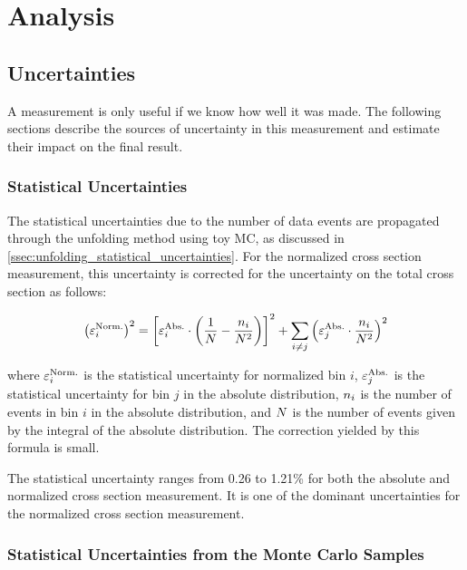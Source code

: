 \chapter{Analysis}
\label{chapter:analysis}

\section{Uncertainties}
\label{sec:uncertainties}

A measurement is only useful if we know how well it was made. The following
sections describe the sources of uncertainty in this measurement and estimate
their impact on the final result.

\subsection{Statistical Uncertainties}
\label{ssec:stat_uncertainty}

The statistical uncertainties due to the number of data events are propagated
through the unfolding method using toy MC, as discussed in
\cref{ssec:unfolding_statistical_uncertainties}. For the normalized cross
section measurement, this uncertainty is corrected for the uncertainty on the
total cross section as follows:

\begin{equation} \label{eq:stat}
    \left( \varepsilon^{\text{Norm.}}_{i} \right)^{2}
    =
    \left[
    \varepsilon^{\text{Abs.}}_{i} \cdot
        \left(
            \frac{1}{N} - \frac{n_{i}}{N^{2}}
        \right)
    \right]^{2}
    +
    \sum_{i \ne j}
    \left(
        \varepsilon^{\text{Abs.}}_{j} \cdot \frac{n_{i}}{N^{2}}
    \right)^{2}
\end{equation}

where $\varepsilon^{\text{Norm.}}_{i}$ is the statistical uncertainty for normalized bin $i$,
$\varepsilon^{\text{Abs.}}_{j}$ is the statistical uncertainty for bin $j$ in the absolute
distribution, $n_{i}$ is the number of events in bin $i$ in the absolute
distribution, and $N$ is the number of events given by the integral of
the absolute distribution. The correction yielded by this formula is small.

The statistical uncertainty ranges from 0.26 to 1.21\% for both the absolute
and normalized cross section measurement. It is one of the dominant
uncertainties for the normalized cross section measurement.

\subsection{Statistical Uncertainties from the Monte Carlo Samples}
\label{ssec:mc_stat_uncertainty}

